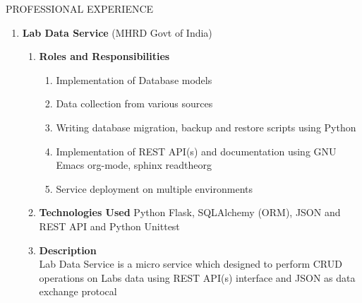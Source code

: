 \documentclass{resume} %
\newcommand{\blank}[1]{\hspace*{#1}}
\begin{document}
\begin{rSection}{PROFESSIONAL EXPERIENCE}
\begin{rSubsection}
\begin{enumerate}[label=\bfseries\arabic*]
\item \textbf {Lab Data Service} (MHRD Govt of India)
  \begin{enumerate}
  \item \textbf{Roles and Responsibilities }
    \begin{enumerate}
    \item Implementation of Database models
    \item Data collection from various sources
    \item Writing database migration, backup and restore scripts using
      Python
    \item Implementation of REST API(s) and documentation
      using GNU Emacs org-mode, sphinx readtheorg
    \item Service deployment on multiple environments
    \end{enumerate}
  \item \textbf{Technologies Used } Python Flask, SQLAlchemy
    (ORM), JSON and REST API and Python Unittest
  \item \textbf{Description } \\ \blank{2 cm} Lab Data
    Service is a micro service which designed to perform
    CRUD operations on Labs data using REST API(s) interface
    and JSON as data exchange protocal
  \end{enumerate}
\end{enumerate}
\end{rSubsection}

\end{rSection}


\end{document}
